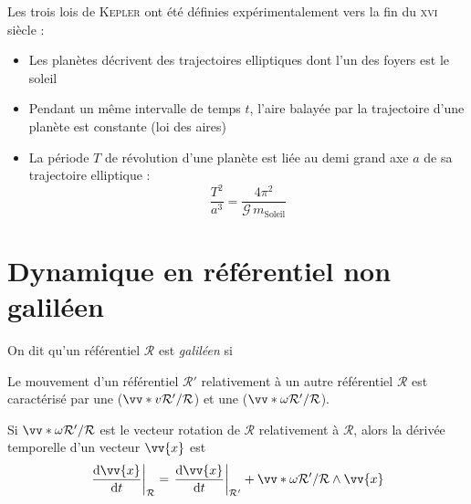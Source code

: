 \documentclass[11pt,a4paper,fleqn,pdftex]{report}
\begin{document}
\begin{itheorem}
   Les trois lois de \textsc{Kepler} ont été définies expérimentalement vers la fin du \textsc{xvi}\ieme{} siècle :
  \begin{itemize}[noitemsep, topsep=4pt,parsep=0pt,partopsep=0pt,leftmargin=3mm,labelindent=\parindent]
    \item Les planètes décrivent des trajectoires elliptiques dont l'un des foyers est le soleil
    \item Pendant un même intervalle de temps $t$, l'aire balayée par la trajectoire d'une planète est constante (loi des aires)
    \item La période $T$ de révolution d'une planète est liée au demi grand axe $a$ de sa trajectoire elliptique : 
    \begin{equation}
       \dfrac{T^2}{a^3}=\dfrac{4\pi^2}{\mathcal{G}\, m_\text{Soleil}}
    \end{equation}
\end{itemize}
\end{itheorem}
\section{Dynamique en référentiel non galiléen}
\begin{dfn}
   On dit qu'un référentiel $\mathcal{R}$ est \emph{galiléen} si 
\end{dfn}
\begin{dfn}
   Le mouvement d'un référentiel $\mathcal{R'}$ relativement à un autre référentiel $\mathcal{R}$ est caractérisé par une  ($\vv*{v}{\mathcal{R'}/\mathcal{R}}$) et une  ($\vv*{\omega}{\mathcal{R'}/\mathcal{R}}$).
\end{dfn}
\begin{itheorem}
   Si $\vv*{\omega}{\mathcal{R'}/\mathcal{R}}$ est le vecteur rotation de $\mathcal{R}$ relativement à $\mathcal{R}$, alors la dérivée temporelle d'un vecteur $\vv{x}$ est 
   \begin{equation}
   \left. \dfrac{\d \vv{x}}{\d t} \right|_\mathcal{R} = \left. \dfrac{\d \vv{x}}{\d t}\right|_\mathcal{R'} + \vv*{\omega}{\mathcal{R'}/\mathcal{R}} \wedge \vv{x}
   \end{equation}
\end{itheorem}
\end{document}
